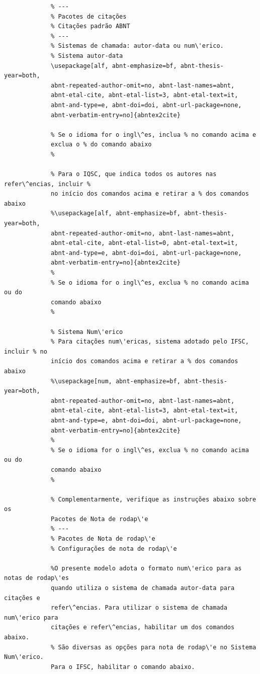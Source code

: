 			 \begin{verbatim}
			 % ---
			 % Pacotes de citações
			 % Citações padrão ABNT
			 % ---
			 % Sistemas de chamada: autor-data ou num\'erico.
			 % Sistema autor-data
			 \usepackage[alf, abnt-emphasize=bf, abnt-thesis-year=both,
			 abnt-repeated-author-omit=no, abnt-last-names=abnt,
			 abnt-etal-cite, abnt-etal-list=3, abnt-etal-text=it,
			 abnt-and-type=e, abnt-doi=doi, abnt-url-package=none,
			 abnt-verbatim-entry=no]{abntex2cite}
			 
			 % Se o idioma for o ingl\^es, inclua % no comando acima e 
			 exclua o % do comando abaixo
			 %
			 
			 % Para o IQSC, que indica todos os autores nas refer\^encias, incluir % 
			 no início dos comandos acima e retirar a % dos comandos abaixo 
			 %\usepackage[alf, abnt-emphasize=bf, abnt-thesis-year=both,
			 abnt-repeated-author-omit=no, abnt-last-names=abnt,
			 abnt-etal-cite, abnt-etal-list=0, abnt-etal-text=it,
			 abnt-and-type=e, abnt-doi=doi, abnt-url-package=none,
			 abnt-verbatim-entry=no]{abntex2cite} 
			 %
			 % Se o idioma for o ingl\^es, exclua % no comando acima ou do
			 comando abaixo
			 %
			 
			 % Sistema Num\'erico
			 % Para citações num\'ericas, sistema adotado pelo IFSC, incluir % no 
			 início dos comandos acima e retirar a % dos comandos abaixo
			 %\usepackage[num, abnt-emphasize=bf, abnt-thesis-year=both,
			 abnt-repeated-author-omit=no, abnt-last-names=abnt,
			 abnt-etal-cite, abnt-etal-list=3, abnt-etal-text=it,
			 abnt-and-type=e, abnt-doi=doi, abnt-url-package=none,
			 abnt-verbatim-entry=no]{abntex2cite} 
			 %
			 % Se o idioma for o ingl\^es, exclua % no comando acima ou do
			 comando abaixo
			 %
			 
			 % Complementarmente, verifique as instruções abaixo sobre os
			 Pacotes de Nota de rodap\'e
			 % ---
			 % Pacotes de Nota de rodap\'e
			 % Configurações de nota de rodap\'e
			  
			 %O presente modelo adota o formato num\'erico para as notas de rodap\'es 
			 quando utiliza o sistema de chamada autor-data para citações e 
			 refer\^encias. Para utilizar o sistema de chamada num\'erico para 
			 citações e refer\^encias, habilitar um dos comandos abaixo.
			 % São diversas as opções para nota de rodap\'e no Sistema Num\'erico.  
			 Para o IFSC, habilitar o comando abaixo.
			  

\end{verbatim}
